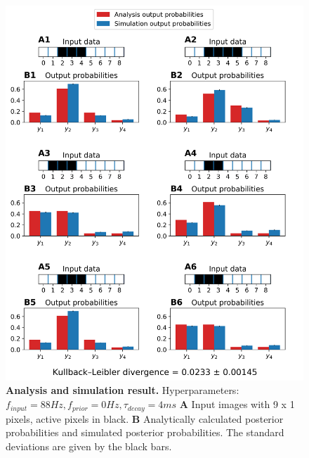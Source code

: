 \begin{figure}
  \includegraphics[width=\linewidth]{figures/1D/1D_88_0_4.png}
   \caption{\textbf{Analysis and simulation result. } Hyperparameters: $f_{input} = 88 Hz, f_{prior} = 0 Hz, \tau_{decay} = 4 ms$ \textbf{A} Input images with 9 x 1 pixels, active pixels in black. \textbf{B} Analytically calculated posterior probabilities and simulated posterior probabilities. The standard deviations are given by the black bars.}
  \label{fig:1D_88_0_4}
\end{figure}

